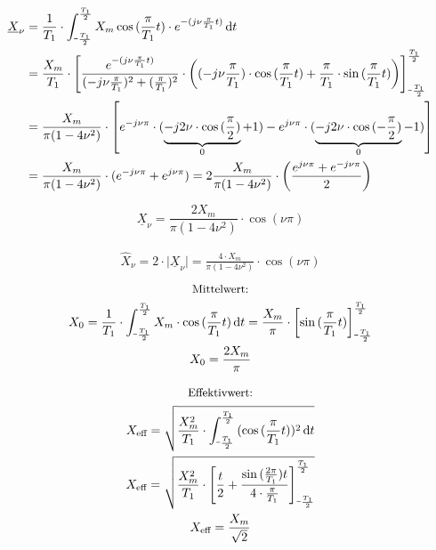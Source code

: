 \documentclass[a4paper, 12pt]{article}
\newcommand*\dif{\mathop{}\!\mathrm{d}}
\newcommand*\shortminus{\scalebox{0.5}[1.0]{\( - \)}}
\begin{document}
    \begin{align*}
      \underline{X}_\nu &= \frac{1}{T_1} \cdot \int_{\shortminus\frac{T_1}{2}}^{\frac{T_1}{2}}{ X_m \cos{(\frac{\pi}{T_1} t) \cdot e^{-(j\nu \frac{\pi}{T_1} t)}} \dif t }\\
      &= \frac{X_m}{T_1} \cdot \left [ \frac{e^{-(j\nu \frac{\pi}{T_1} t)}}{(-j \nu \frac{\pi}{T_1})^2+(\frac{\pi}{T_1})^2} \cdot \left( (-j\nu\frac{\pi}{T_1})\cdot \cos{(\frac{\pi}{T_1} t )} + \frac{\pi}{T_1}\cdot \sin{(\frac{\pi}{T_1} t)} \right) \right]_{\shortminus\frac{T_1}{2}}^{\frac{T_1}{2}}\\
      &= \frac{X_m}{\pi (1-4\nu^2)} \cdot \left[  e^{-j\nu\pi} \cdot (\underbrace{-j 2 \nu \cdot \cos{(\frac{\pi}{2})}}_0+1) - e^{j\nu\pi} \cdot (\underbrace{-j 2 \nu \cdot \cos{(-\frac{\pi}{2})}}_0-1) \right]\\
      &= \frac{X_m}{\pi (1-4\nu^2)} \cdot (e^{-j\nu\pi}+e^{j\nu\pi}) = 2 \frac{X_m}{\pi (1-4\nu^2)} \cdot \left( \frac{e^{j\nu\pi}+e^{-j\nu\pi}}{2} \right)
    \end{align*}

    \vspace{0.021276873\paperheight}
    \begin{equation*}
      \underline{X}_\nu =  \frac{2 X_m}{\pi (1-4\nu^2)} \cdot \cos{(\nu \pi)}
    \end{equation*}

    \begin{gather*}
      \hat{X}_\nu = 2 \cdot \mid \underline{X}_\nu \mid = \frac{4 \cdot X_m}{\pi (1-4\nu^2)}\cdot \cos{(\nu \pi)}
    \end{gather*}
    \begin{gather*}
      \text{\small Mittelwert:}\\
      X_0 = \frac{1}{T_1} \cdot \int_{\shortminus\frac{T_1}{2}}^{\frac{T_1}{2}}{X_m \cdot \cos{(\frac{\pi}{T_1} t)} \dif t} = \frac{X_m}{\pi} \cdot \left[\sin{(\frac{\pi}{T_1}t)} \right]_{\shortminus\frac{T_1}{2}}^{\frac{T_1}{2}}\\
      X_0 = \frac{2 X_m}{\pi}
    \end{gather*}

    \begin{gather*}
      \text{\small Effektivwert:}\\
      X_{\text{eff}} = \sqrt{\frac{X_m^2}{T_1} \cdot \int_{\shortminus\frac{T_1}{2}}^{\frac{T_1}{2}}{(\cos{(\frac{\pi}{T_1} t))^2} \dif t}}\\
      X_{\text{eff}} = \sqrt{ \frac{X_m^2}{T_1} \cdot \left[  \frac{t}{2} + \frac{\sin{(\frac{2\pi}{T_1})t}}{4 \cdot \frac{\pi}{T_1}} \right]_{\shortminus\frac{T_1}{2}}^{\frac{T_1}{2}} }\\
      X_{\text{eff}} = \frac{X_m}{\sqrt{2}}
    \end{gather*}
\end{document}
